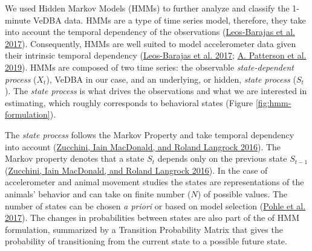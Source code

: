 \documentclass[english,msc,numbers,hidelinks]{coppe}
\begin{document}
  We used Hidden Markov Models (HMMs) to further analyze and classify the 1-minute VeDBA data. HMMs are a type of time series model, therefore, they take into account the temporal dependency of the observations (\protect\hyperlink{ref-leosbarajas2017}{Leos-Barajas et al. 2017}). Consequently, HMMs are well suited to model accelerometer data given their intrinsic temporal dependency (\protect\hyperlink{ref-leosbarajas2017}{Leos-Barajas et al. 2017}; \protect\hyperlink{ref-patterson2019}{A. Patterson et al. 2019}). HMMs are composed of two time series: the observable \emph{state-dependent process} (\(X_t\)), VeDBA in our case, and an underlying, or hidden, \emph{state process} (\(S_t\)). The \emph{state process} is what drives the observations and what we are interested in estimating, which roughly corresponds to behavioral states (Figure \ref{fig:hmm-formulation}).

  The \emph{state process} follows the Markov Property and take temporal dependency into account (\protect\hyperlink{ref-zucchini2016}{Zucchini, Iain MacDonald, and Roland Langrock 2016}). The Markov property denotes that a state \(S_t\) depends only on the previous state \(S_{t-1}\) (\protect\hyperlink{ref-zucchini2016}{Zucchini, Iain MacDonald, and Roland Langrock 2016}). In the case of accelerometer and animal movement studies the states are representations of the animals' behavior and can take on finite number (\(N\)) of possible values. The number of states can be chosen \emph{a priori} or based on model selection (\protect\hyperlink{ref-pohle2017}{Pohle et al. 2017}). The changes in probabilities between states are also part of the of HMM formulation, summarized by a Transition Probability Matrix that gives the probability of transitioning from the current state to a possible future state.
\end{document}
